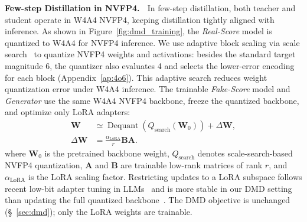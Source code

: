 \textbf{Few-step Distillation in NVFP4.} $\;$
In few-step distillation, both teacher and student operate in W4A4 NVFP4, keeping distillation tightly aligned with inference. As shown in Figure~\ref{fig:dmd_training}, the \textit{Real-Score} model is quantized to W4A4 for NVFP4 inference. We use adaptive block scaling via scale search~\cite{cook2025four} to quantize NVFP4 weights and activations: besides the standard target magnitude 6, the quantizer also evaluates 4 and selects the lower-error encoding for each block (Appendix~\ref{ap:4o6}). This adaptive search reduces weight quantization error under W4A4 inference. The trainable \textit{Fake-Score} model and \textit{Generator} use the same W4A4 NVFP4 backbone, freeze the quantized backbone, and optimize only LoRA adapters:
\begin{equation}
\begin{aligned}
\mathbf{W}
&\simeq
\operatorname{Dequant}\!\left(Q_{\mathrm{search}}(\mathbf{W}_0)\right)
+ \Delta \mathbf{W}, \\
\Delta \mathbf{W}
&=
\frac{\alpha_{\mathrm{LoRA}}}{r}\mathbf{B}\mathbf{A}.
\end{aligned}
\end{equation}
where $\mathbf{W}_0$ is the pretrained backbone weight, $Q_{\mathrm{search}}$ denotes scale-search-based NVFP4 quantization, $\mathbf{A}$ and $\mathbf{B}$ are trainable low-rank matrices of rank $r$, and $\alpha_{\mathrm{LoRA}}$ is the LoRA scaling factor. Restricting updates to a LoRA subspace follows recent low-bit adapter tuning in LLMs~\cite{dettmers2023qlora,huang2025qerl} and is more stable in our DMD setting than updating the full quantized backbone~\cite{yang2025longlive,zhu2026causal,huang2025self}. The DMD objective is unchanged (\S~\ref{sec:dmd}); only the LoRA weights are trainable. 
